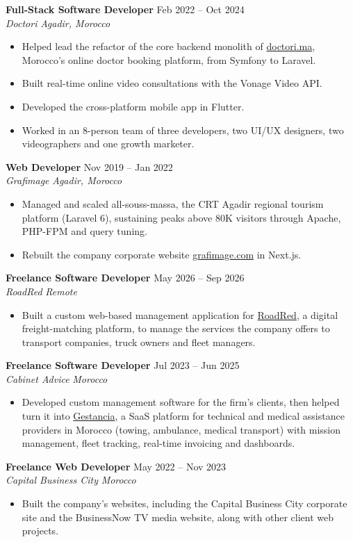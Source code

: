 \documentclass[10pt,a4paper]{article}
\newcommand{\entry}[4]{%
  \textbf{#1} \hfill #2\\
  \textit{#3} \hfill \textit{#4}\par\vspace{1pt}}
\begin{document}
\entry{Full-Stack Software Developer}{Feb 2022 -- Oct 2024}{Doctori}{Agadir, Morocco}
\begin{itemize}
  \item Helped lead the refactor of the core backend monolith of \href{https://doctori.ma}{doctori.ma}, Morocco's online doctor
        booking platform, from Symfony to Laravel.
  \item Built real-time online video consultations with the Vonage Video API.
  \item Developed the cross-platform mobile app in Flutter.
  \item Worked in an 8-person team of three developers, two UI/UX designers, two videographers and one growth marketer.
\end{itemize}

\entry{Web Developer}{Nov 2019 -- Jan 2022}{Grafimage}{Agadir, Morocco}
\begin{itemize}
  \item Managed and scaled all-souss-massa, the CRT Agadir regional tourism platform (Laravel 6), sustaining peaks above
        80K visitors through Apache, PHP-FPM and query tuning.
  \item Rebuilt the company corporate website \href{https://grafimage.com}{grafimage.com} in Next.js.
\end{itemize}

\entry{Freelance Software Developer}{May 2026 -- Sep 2026}{RoadRed}{Remote}
\begin{itemize}
  \item Built a custom web-based management application for \href{https://roadred.fr}{RoadRed}, a digital freight-matching
        platform, to manage the services the company offers to transport companies, truck owners and fleet managers.
\end{itemize}

\entry{Freelance Software Developer}{Jul 2023 -- Jun 2025}{Cabinet Advice}{Morocco}
\begin{itemize}
  \item Developed custom management software for the firm's clients, then helped turn it into
        \href{https://gestancia.com}{Gestancia}, a SaaS platform for technical and medical assistance providers in Morocco
        (towing, ambulance, medical transport) with mission management, fleet tracking, real-time invoicing and dashboards.
\end{itemize}

\entry{Freelance Web Developer}{May 2022 -- Nov 2023}{Capital Business City}{Morocco}
\begin{itemize}
  \item Built the company's websites, including the Capital Business City corporate site and the BusinessNow TV media website,
        along with other client web projects.
\end{itemize}
\end{document}
